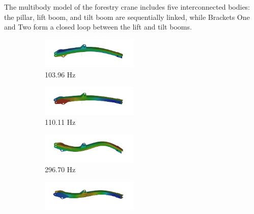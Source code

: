 The multibody model of the forestry crane includes five interconnected bodies: the pillar, lift boom, and tilt boom are sequentially linked, while Brackets One and Two form a closed loop between the lift and tilt booms. 
\begin{figure}[ht]
    \begin{subfigure}{0.5\textwidth} 
        \centering
        \includegraphics[width=1.82in]{LB01.png}
        \caption{103.96 Hz}
        \label{LiftSurrogate}
    \end{subfigure}%
    \begin{subfigure}{0.5\textwidth} 
        \centering
        \includegraphics[width=1.82in]{LB02.png}
        \caption{110.11 Hz}
        \label{TiltSurrogate}
    \end{subfigure}
    \begin{subfigure}{0.5\textwidth} 
        \centering
        \includegraphics[width=1.82in]{LB03.png}
        \caption{296.70 Hz}
        \label{LiftSurrogate}
    \end{subfigure}%
    \begin{subfigure}{0.5\textwidth} 
        \centering
        \includegraphics[width=1.82in]{LB04.png}

\end{subfigure}
\end{figure}
